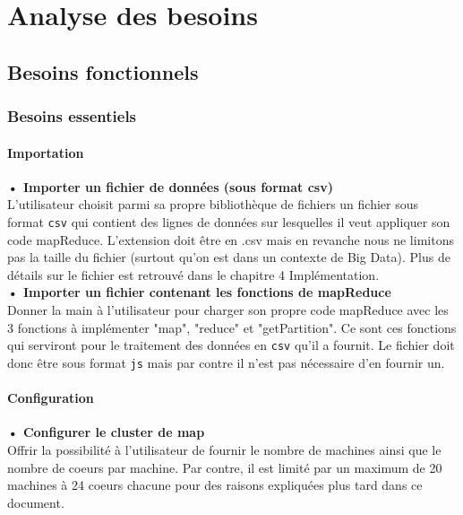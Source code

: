 \chapter{Analyse des besoins}

\section{Besoins fonctionnels}
\subsection{Besoins essentiels}


\subsubsection{Importation}

\textbf{• Importer un fichier de données (sous format csv)\\} L'utilisateur choisit parmi sa propre bibliothèque de fichiers un fichier sous format {\tt csv} qui contient des lignes de données sur lesquelles il veut appliquer son code mapReduce. L'extension doit être en .csv mais en revanche nous ne limitons pas la taille du fichier (surtout qu'on est dans un contexte de Big Data). Plus de détails sur le fichier est retrouvé dans le chapitre 4 Implémentation.\\

\textbf{• Importer un fichier contenant les fonctions de mapReduce\\}   
 Donner la main à l'utilisateur pour charger son propre code mapReduce avec les 3 fonctions à implémenter "map", "reduce" et "getPartition". Ce sont ces fonctions qui serviront pour le traitement des données en {\tt csv} qu'il a fournit. Le fichier doit donc être sous format {\tt js} mais par contre il n'est pas nécessaire d'en fournir un.\\

\subsubsection{Configuration} 

\textbf{• Configurer le cluster de map\\ } Offrir la possibilité à l'utilisateur de fournir le nombre de machines ainsi que le nombre de coeurs par machine. Par contre, il est limité par un maximum de 20 machines à 24 coeurs chacune pour des raisons expliquées plus tard dans ce document. \\

